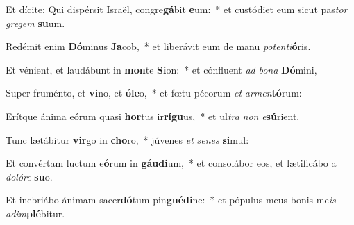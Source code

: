 \item Et dícite: Qui dispérsit Israël, congre\textbf{gá}bit \textbf{e}um:~* et custódiet eum sicut pas\textit{tor} \textit{gre}\textit{gem} \textbf{su}um.
\item Redémit enim \textbf{Dó}minus \textbf{Ja}cob,~* et liberávit eum de manu \textit{pot}\textit{en}\textit{ti}\textbf{ó}ris.
\item Et vénient, et laudábunt in \textbf{mon}te \textbf{Si}on:~* et cónfluent \textit{ad} \textit{bo}\textit{na} \textbf{Dó}mini,
\item Super fruménto, et \textbf{vi}no, et \textbf{ó}\textbf{le}o,~* et fœtu pécorum \textit{et} \textit{ar}\textit{men}\textbf{tó}rum:
\item Erítque ánima eórum quasi \textbf{hor}tus ir\textbf{rí}\textbf{gu}us,~* et ul\textit{tra} \textit{non} \textit{e}\textbf{sú}rient.
\item Tunc lætábitur \textbf{vir}go in \textbf{cho}ro,~* júvenes \textit{et} \textit{se}\textit{nes} \textbf{si}mul:
\item Et convértam luctum e\textbf{ó}rum in \textbf{gáu}\textbf{di}um,~* et consolábor eos, et lætificábo a \textit{do}\textit{ló}\textit{re} \textbf{su}o.
\item Et inebriábo ánimam sacer\textbf{dó}tum pin\textbf{gué}\textbf{di}ne:~* et pópulus meus bonis me\textit{is} \textit{ad}\textit{im}\textbf{plé}bitur.
